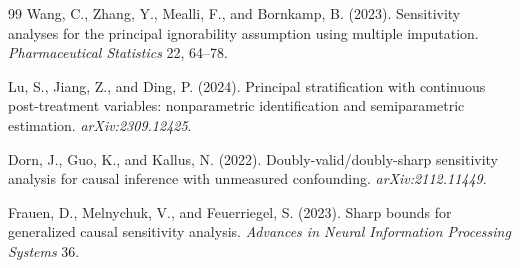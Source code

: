 \documentclass[11pt]{article}
\theoremstyle{definition}
\theoremstyle{plain}
\theoremstyle{remark}
\begin{document}
\begin{thebibliography}{99}
Wang, C., Zhang, Y., Mealli, F., and Bornkamp, B. (2023).
Sensitivity analyses for the principal ignorability assumption using multiple imputation.
\emph{Pharmaceutical Statistics} 22, 64--78.

Lu, S., Jiang, Z., and Ding, P. (2024).
Principal stratification with continuous post-treatment variables: nonparametric identification and semiparametric estimation.
\emph{arXiv:2309.12425}.

Dorn, J., Guo, K., and Kallus, N. (2022).
Doubly-valid/doubly-sharp sensitivity analysis for causal inference with unmeasured confounding.
\emph{arXiv:2112.11449}.

Frauen, D., Melnychuk, V., and Feuerriegel, S. (2023).
Sharp bounds for generalized causal sensitivity analysis.
\emph{Advances in Neural Information Processing Systems} 36.
\end{thebibliography}
\end{document}
